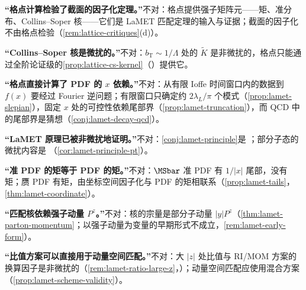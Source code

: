 \begin{tcolorbox}[enhanced,breakable,title=本章澄清的常见误解,fonttitle=\bfseries,
  colback=gray!3!white,colframe=gray!55!black,boxrule=0.6pt,arc=2pt,
  left=5pt,right=5pt,top=3pt,bottom=3pt,before skip=6pt,after skip=6pt]
\textbf{“格点计算检验了截面的因子化定理。”}不对：格点提供强子矩阵元——矩、准分布、Collins--Soper 核——它们是 LaMET 匹配定理的输入与证据；截面的因子化不由格点检验（\cref{rem:lattice-critiques}(d)）。\par
\textbf{“Collins--Soper 核是微扰的。”}不对：$b_{\mathrm T}\sim1/\Lambda$ 处的 $\tilde K$ 是非微扰的，格点只能通过全阶论证级的\cref{prop:lattice-cs-kernel}（\tagA）提供它。\par
\textbf{“格点直接计算了 PDF 的 $x$ 依赖。”}不对：从有限 Ioffe 时间窗口内的数据到 $f(x)$ 要经过 Fourier 逆问题；有限窗口只确定约 $2\lambda_L/\pi$ 个模式（\cref{prop:lamet-slepian}），固定 $x$ 处的可控性依赖尾部界（\cref{prop:lamet-truncation}），而 QCD 中的尾部界是猜想（\cref{conj:lamet-decay-qcd}）。\par
\textbf{“LaMET 原理已被非微扰地证明。”}不对：\cref{conj:lamet-principle}是 \tagC；部分子态的微扰内容是 \tagA（\cref{cor:lamet-principle-pt}）。\par
\textbf{“准 PDF 的矩等于 PDF 的矩。”}不对：$\MSbar$ 准 PDF 有 $1/|x|$ 尾部，没有矩；赝 PDF 有矩，由坐标空间因子化与 PDF 的矩相联系（\cref{prop:lamet-tails}，\cref{thm:lamet-coordinate}）。\par
\textbf{“匹配核依赖强子动量 $P^z$。”}不对：核的宗量是部分子动量 $|y|P^z$（\cref{thm:lamet-parton-momentum}；以强子动量为变量的早期形式不成立，\cref{rem:lamet-early-form}）。\par
\textbf{“比值方案可以直接用于动量空间匹配。”}不对：大 $|z|$ 处比值与 RI/MOM 方案的换算因子是非微扰的（\cref{rem:lamet-ratio-large-z}，\tagC）；动量空间匹配应使用混合方案（\cref{prop:lamet-scheme-validity}）。
\end{tcolorbox}

